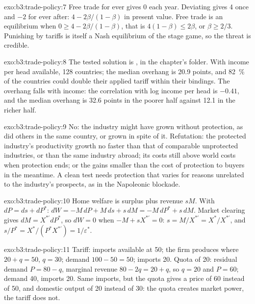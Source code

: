\begin{solution}{exo:b3:trade-policy:7}
Free trade for ever gives 0 each year. Deviating gives 4 once and $-2$ for ever
after: $4 - 2\beta/(1 - \beta)$ in present value. Free trade is an equilibrium when $0 \ge 4 -
2\beta/(1 - \beta)$, that is $4(1 - \beta) \le 2\beta$, or $\beta \ge 2/3$. Punishing by tariffs is
itself a Nash equilibrium of the stage game, so the threat is credible.
\end{solution}

\begin{solution}{exo:b3:trade-policy:8}
The tested solution is , in the chapter's 
folder. With income per head available, 128 countries; the median overhang is 20.9
points, and 82~\% of the countries could double their applied tariff within their
bindings. The overhang falls with income: the correlation with log income per head
is $-0.41$, and the median overhang is 32.6 points in the poorer half against 12.1 in
the richer half. %
\end{solution}

\begin{solution}{exo:b3:trade-policy:9}
No: the industry might have grown without protection, as did others in the same
country, or grown in spite of it. Refutation: the protected industry's
productivity growth no faster than that of comparable unprotected industries, or
than the same industry abroad; its costs still above world costs when protection
ends; or the gains smaller than the cost of protection to buyers in the meantime.
A clean test needs protection that varies for reasons unrelated to the industry's
prospects, as in the Napoleonic blockade.
\end{solution}

\begin{solution}{exo:b3:trade-policy:10}
Home welfare is surplus plus revenue $sM$. With $dP = ds + dP^*$: $dW = -M\,dP + M\,ds +
s\,dM = -M\,dP^* + s\,dM$. Market clearing gives $dM = X^{*\prime}dP^*$, so $dW = 0$ when $-M + sX^{*\prime} =
0$: $s = M/X^{*\prime} = X^*/X^{*\prime}$, and $s/P^* = X^*/(P^*X^{*\prime}) = 1/\varepsilon^*$.
\end{solution}

\begin{solution}{exo:b3:trade-policy:11}
Tariff: imports available at 50; the firm produces where $20 + q = 50$, $q = 30$;
demand $100 - 50 = 50$; imports 20. Quota of 20: residual demand $P = 80 - q$, marginal
revenue $80 - 2q = 20 + q$, so $q = 20$ and $P = 60$; demand 40, imports 20. Same imports,
but the quota gives a price of 60 instead of 50, and domestic output of 20 instead
of 30: the quota creates market power, the tariff does not.
\end{solution}

